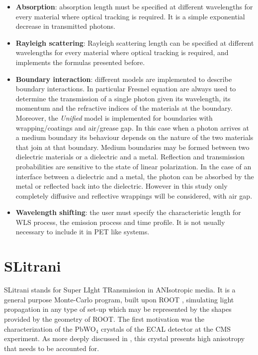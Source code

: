 \begin{itemize}
\item \textbf{Absorption}: absorption length must be specified at different wavelengths for every material where optical tracking is required. It is a simple exponential decrease in transmitted photons.
\item \textbf{Rayleigh scattering}: Rayleigh scattering length can be specified at different wavelengths for every material where optical tracking is required, and implements the formulas presented before.
\item \textbf{Boundary interaction}: different models are implemented to describe boundary interactions. In particular Fresnel equation are always used to determine the transmission of a single photon given its wavelength, its momentum and the refractive indices of the materials at the boundary.
Moreover, the \textit{Unified} model is implemented for boundaries with wrapping/coatings and air/grease gap.
In this case when a photon arrives at a medium boundary its behaviour depends on the nature of the two materials that join at that boundary. Medium boundaries may be formed between two dielectric materials or a dielectric and a metal. Reflection and transmission probabilities are sensitive to the state of linear polarization. In the case of an interface between a dielectric and a metal, the photon can be absorbed by the metal or reflected back into the dielectric.
However in this study only completely diffusive and reflective wrappings will be considered, with air gap.
\item \textbf{Wavelength shifting}: the user must specify the characteristic length for WLS process, the emission process and time profile. It is not usually necessary to include it in PET like systems.
\end{itemize}

\section{SLitrani}
SLitrani stands for Super LIght TRansmission in ANIsotropic media. It is a general purpose Monte-Carlo program, built upon ROOT \cite{ROOT}, simulating light propagation in any type of set-up which may be represented by the shapes provided by the geometry of ROOT. The first motivation was the characterization of the PbWO$_{4}$ crystals of the ECAL detector at the CMS experiment. As more deeply discussed in \cite{Gentit2002}, this crystal presents high anisotropy that needs to be accounted for.

